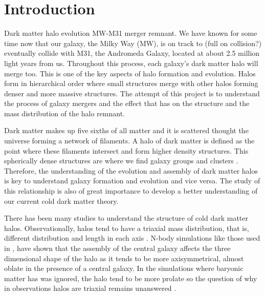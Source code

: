 \documentclass{aastex62}
\newcommand\latex{La\TeX}
\begin{document}
\section{Introduction} \label{sec:intro}





Dark matter halo evolution MW-M31 merger remnant.
We have known for some time now that our galaxy, the Milky Way (MW), is on track to (full on collision?) eventually collide with M31, the Andromeda Galaxy, located at about 2.5 million light years from us.
Throughout this process, each galaxy's dark matter halo will merge too. This is one of the key aspects of halo formation and evolution. Halos form in hierarchical order where small structures merge with other halos forming denser and more massive structures.
The attempt of this project is to understand the process of galaxy mergers and the effect that has on the structure and the mass distribution of the halo remnant. 


Dark matter makes up five sixths of all matter and it is scattered thought the universe forming a network of filaments. A halo of dark matter is defined as the point where these filaments intersect and form higher density structures. This spherically dense structures are where we find galaxy groups and clusters \citep{Drakos119}. Therefore, the understanding of the evolution and assembly of dark matter halos is key to understand galaxy formation and evolution and vice versa. The study of this relationship is also of great importance to develop a better understanding of our current cold dark matter theory.


There has been many studies to understand the structure of cold dark matter halos. Observationally, halos tend to have a triaxial mass distribution, that is, different distribution and length in each axis \citep{knebe06}.  N-body simulations like those used in \cite{Abadi10}, have shown that the assembly of the central galaxy affects the three dimensional shape of the halo as it tends to be more axisymmetrical, almost oblate in the presence of a central galaxy. In the simulations where baryonic matter has was ignored, the halo tend to be more prolate so the question of why in observations halos are triaxial remains unanswered \citep{Abadi10}.
\end{document}
